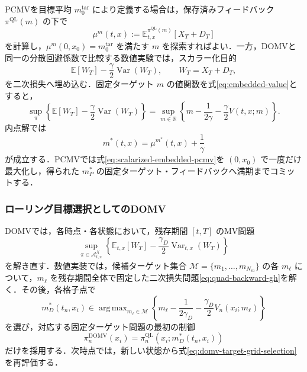 \documentclass[10pt,a4paper]{article}
\theoremstyle{plain}
\theoremstyle{definition}
\newcommand{\E}{\mathbb{E}}
\DeclareMathOperator{\Var}{Var}
\DeclareMathOperator*{\argmax}{arg\,max}
\newcommand{\A}{\mathcal{A}}
\begin{document}
PCMVを目標平均 $m_0^{\mathrm{tar}}$ により定義する場合は，保存済みフィードバック $\pi^{\mathrm{QL}}(m)$ の下で
\[
  \mu^m(t,x):=\E_{t,x}^{\pi^{\mathrm{QL}}(m)}[X_T+D_T]
\]
を計算し，$\mu^m(0,x_0)=m_0^{\mathrm{tar}}$ を満たす $m$ を探索すればよい．一方，DOMVと同一の分散回避係数で比較する数値実験では，スカラー化目的
\[
  \E[W_T]-\frac{\gamma}{2}\Var(W_T),
  \qquad W_T=X_T+D_T,
\]
を二次損失へ埋め込む．固定ターゲット $m$ の値関数を式\eqref{eq:embedded-value}とすると，
\begin{equation}
  \sup_{\pi}
  \left\{\E[W_T]-\frac{\gamma}{2}\Var(W_T)\right\}
  =\sup_{m\in\mathbb R}
  \left\{
    m-\frac{1}{2\gamma}-\frac{\gamma}{2}V(t,x;m)
  \right\}.
  \label{eq:scalarized-embedded-pcmv}
\end{equation}
内点解では
\begin{equation}
  m^*(t,x)=\mu^{m^*}(t,x)+\frac{1}{\gamma}
  \label{eq:embedded-fixed-point}
\end{equation}
が成立する．PCMVでは式\eqref{eq:scalarized-embedded-pcmv}を $(0,x_0)$ で一度だけ最大化し，得られた $m_P^*$ の固定ターゲット・フィードバックへ満期までコミットする．

\subsubsection{ローリング目標選択としてのDOMV}

DOMVでは，各時点・各状態において，残存期間 $[t,T]$ のMV問題
\begin{equation}
  \sup_{\pi\in\A^X_{t,x}}
  \left\{
    \E_{t,x}[W_T]
    -\frac{\gamma_D}{2}\Var_{t,x}(W_T)
  \right\}
  \label{eq:domv-discrete-problem}
\end{equation}
を解き直す．数値実装では，候補ターゲット集合 $\mathcal M=\{m_1,\ldots,m_{N_m}\}$ の各 $m_\ell$ について，$m_\ell$ を残存期間全体で固定した二次損失問題\eqref{eq:quad-backward-gh}を解く．その後，各格子点で
\begin{equation}
  m_D^*(t_n,x_i)
  \in\argmax_{m_\ell\in\mathcal M}
  \left\{
    m_\ell-\frac{1}{2\gamma_D}
    -\frac{\gamma_D}{2}V_n(x_i;m_\ell)
  \right\}
  \label{eq:domv-target-grid-selection}
\end{equation}
を選び，対応する固定ターゲット問題の最初の制御
\begin{equation}
  \pi_n^{\mathrm{DOMV}}(x_i)
  =\pi_n^{\mathrm{QL}}\!\left(x_i;m_D^*(t_n,x_i)\right)
  \label{eq:domv-first-control}
\end{equation}
だけを採用する．次時点では，新しい状態から式\eqref{eq:domv-target-grid-selection}を再評価する．
\end{document}
